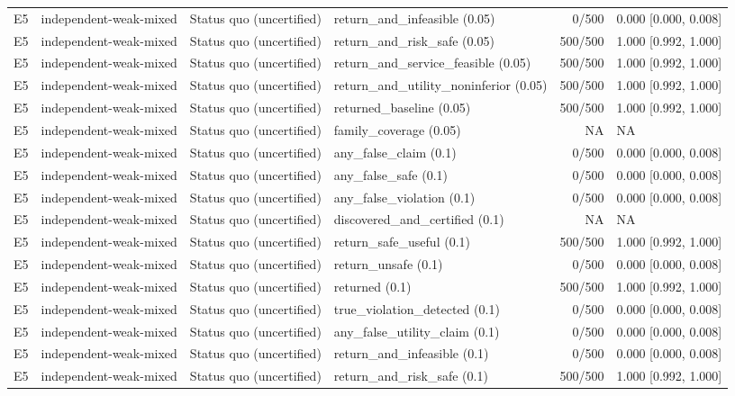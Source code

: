 \begin{longtable}{p{.04\linewidth}p{.18\linewidth}p{.19\linewidth}p{.16\linewidth}r p{.21\linewidth}}
E5 & independent-weak-mixed & Status quo (uncertified) & return\_and\_infeasible (0.05) & 0/500 & 0.000 [0.000, 0.008]\\
E5 & independent-weak-mixed & Status quo (uncertified) & return\_and\_risk\_safe (0.05) & 500/500 & 1.000 [0.992, 1.000]\\
E5 & independent-weak-mixed & Status quo (uncertified) & return\_and\_service\_feasible (0.05) & 500/500 & 1.000 [0.992, 1.000]\\
E5 & independent-weak-mixed & Status quo (uncertified) & return\_and\_utility\_noninferior (0.05) & 500/500 & 1.000 [0.992, 1.000]\\
E5 & independent-weak-mixed & Status quo (uncertified) & returned\_baseline (0.05) & 500/500 & 1.000 [0.992, 1.000]\\
E5 & independent-weak-mixed & Status quo (uncertified) & family\_coverage (0.05) & NA & NA\\
E5 & independent-weak-mixed & Status quo (uncertified) & any\_false\_claim (0.1) & 0/500 & 0.000 [0.000, 0.008]\\
E5 & independent-weak-mixed & Status quo (uncertified) & any\_false\_safe (0.1) & 0/500 & 0.000 [0.000, 0.008]\\
E5 & independent-weak-mixed & Status quo (uncertified) & any\_false\_violation (0.1) & 0/500 & 0.000 [0.000, 0.008]\\
E5 & independent-weak-mixed & Status quo (uncertified) & discovered\_and\_certified (0.1) & NA & NA\\
E5 & independent-weak-mixed & Status quo (uncertified) & return\_safe\_useful (0.1) & 500/500 & 1.000 [0.992, 1.000]\\
E5 & independent-weak-mixed & Status quo (uncertified) & return\_unsafe (0.1) & 0/500 & 0.000 [0.000, 0.008]\\
E5 & independent-weak-mixed & Status quo (uncertified) & returned (0.1) & 500/500 & 1.000 [0.992, 1.000]\\
E5 & independent-weak-mixed & Status quo (uncertified) & true\_violation\_detected (0.1) & 0/500 & 0.000 [0.000, 0.008]\\
E5 & independent-weak-mixed & Status quo (uncertified) & any\_false\_utility\_claim (0.1) & 0/500 & 0.000 [0.000, 0.008]\\
E5 & independent-weak-mixed & Status quo (uncertified) & return\_and\_infeasible (0.1) & 0/500 & 0.000 [0.000, 0.008]\\
E5 & independent-weak-mixed & Status quo (uncertified) & return\_and\_risk\_safe (0.1) & 500/500 & 1.000 [0.992, 1.000]\\

\end{longtable}
